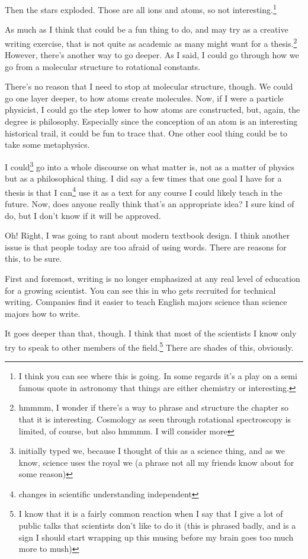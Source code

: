 \documentclass[12pt]{article}[titlepage]
\newcommand{\1}{\={a}}
\newcommand{\2}{\={e}}
\newcommand{\3}{\={\i}}
\newcommand{\4}{\=o}
\newcommand{\5}{\=u}
\newcommand{\6}{\={A}}
\renewcommand{\,}{\textsuperscript{,}}
\begin{document}
Then the stars exploded.
Those are all ions and atoms, so not interesting.\footnote{I think you can see where this is going.
In some regards it's a play on a semi famous quote in astronomy that things are either chemistry or interesting.}

As much as I think that could be a fun thing to do, and may try as a creative writing exercise, that is not quite as academic as many might want for a thesis.\footnote{hmmmm, I wonder if there's a way to phrase and structure the chapter so that it is interesting.
Cosmology as seen through rotational spectroscopy is limited, of course, but also hmmmm. I will consider more}
However, there's another way to go deeper.
As I said, I could go through how we go from a molecular structure to rotational constants.

There's no reason that I need to stop at molecular structure, though.
We could go one layer deeper, to how atoms create molecules.
Now, if I were a particle physicist, I could go the step lower to how atoms are constructed, but, again, the degree is philosophy.
Especially since the conception of an atom is an interesting historical trail, it could be fun to trace that.
One other cool thing could be to take some metaphysics.

I could\footnote{initially typed we, because I thought of this as a science thing, and as we know, science uses the royal we (a phrase not all my friends know about for some reason)} go into a whole discourse on what matter is, not as a matter of physics but as a philosophical thing.
I did say a few times that one goal I have for a thesis is that I can\footnote{changes in scientific understanding independent} use it as a text for any course I could likely teach in the future.
Now, does anyone really think that's an appropriate idea?
I sure kind of do, but I don't know if it will be approved.

Oh! Right, I was going to rant about modern textbook design.
I think another issue is that people today are too afraid of using words.
There are reasons for this, to be sure.

First and foremost, writing is no longer emphasized at any real level of education for a growing scientist.
You can see this in who gets recruited for technical writing.
Companies find it easier to teach English majors science than science majors how to write.

It goes deeper than that, though.
I think that most of the scientists I know only try to speak to other members of the field.\footnote{I know that it is a fairly common reaction when I say that I give a lot of public talks that scientists don't like to do it (this is phrased badly, and is a sign I should start wrapping up this musing before my brain goes too much more to mush)}
There are shades of this, obviously.
\end{document}
